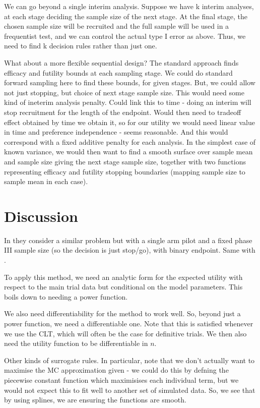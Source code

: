 \documentclass[sagev, Crown]{sagej} %
\begin{document}
We can go beyond a single interim analysis. Suppose we have k interim analyses, at each stage deciding the sample size of the next stage. At the final stage, the chosen sample size will be recruited and the full sample will be used in a frequentist test, and we can control the actual type I error as above. Thus, we need to find k decision rules rather than just one. 

What about a more flexible sequential design? The standard approach finds efficacy and futility bounds at each sampling stage. We could do standard forward sampling here to find these bounds, for given stages. But, we could allow not just stopping, but choice of next stage sample size. This would need some kind of ineterim analysis penalty. Could link this to time - doing an interim will stop recruitment for the length of the endpoint. Would then need to tradeoff effect obtained by time we obtain it, so for our utility we would need linear value in time and preference independence - seems reasonable. And this would correspond with a fixed additive penalty for each analysis. In the simplest case of known variance, we would then want to find a smooth surface over sample mean and sample size giving the next stage sample size, together with two functions representing efficacy and futility stopping boundaries (mapping sample size to sample mean in each case).



\section{Discussion}


In \cite{Brunier1994} they consider a similar problem but with a single arm pilot and a fixed phase III sample size (so the decision is just stop/go), with binary endpoint. Same with \cite{Stallard1998}.

To apply this method, we need an analytic form for the expected utility with respect to the main trial data but conditional on the model parameters. This boils down to needing a power function.

We also need differentiability for the method to work well. So, beyond just a power function, we need a differentiable one. Note that this is satisfied whenever we use the CLT, which will often be the case for definitive trials. We then also need the utility function to be differentiable in $n$. 

Other kinds of surrogate rules. In particular, note that we don't actually want to maximise the MC approximation given - we could do this by defning the piecewise constant function which maximisises each individual term, but we would not expect this to fit well to another set of simulated data. So, we see that by using splines, we are ensuring the functions are smooth.
\end{document}
